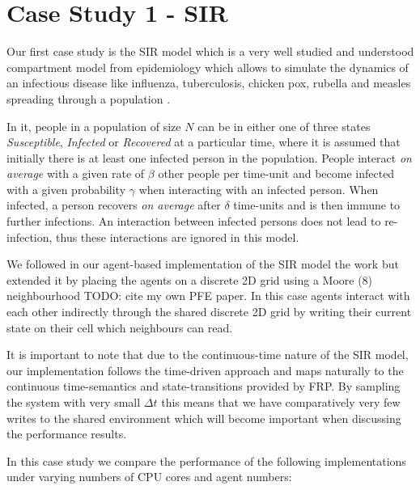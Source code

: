 \section{Case Study 1 - SIR} 
Our first case study is the SIR model which is a very well studied and understood compartment model from epidemiology \cite{kermack_contribution_1927} which allows to simulate the dynamics of an infectious disease like influenza, tuberculosis, chicken pox, rubella and measles spreading through a population \cite{enns_its_2010}.

In it, people in a population of size $N$ can be in either one of three states \textit{Susceptible}, \textit{Infected} or \textit{Recovered} at a particular time, where it is assumed that initially there is at least one infected person in the population. People interact \textit{on average} with a given rate of $\beta$ other people per time-unit and become infected with a given probability $\gamma$ when interacting with an infected person. When infected, a person recovers \textit{on average} after $\delta$ time-units and is then immune to further infections. An interaction between infected persons does not lead to re-infection, thus these interactions are ignored in this model. 

We followed in our agent-based implementation of the SIR model the work \cite{macal_agent-based_2010} but extended it by placing the agents on a discrete 2D grid using a Moore (8) neighbourhood TODO: cite my own PFE paper. In this case agents interact with each other indirectly through the shared discrete 2D grid by writing their current state on their cell which neighbours can read.

It is important to note that due to the continuous-time nature of the SIR model, our implementation follows the time-driven \cite{meyer_event-driven_2014} approach and maps naturally to the continuous time-semantics and state-transitions provided by FRP. By sampling the system with very small $\Delta t$ this means that we have comparatively very few writes to the shared environment which will become important when discussing the performance results.

In this case study we compare the performance of the following implementations under varying numbers of CPU cores and agent numbers:

